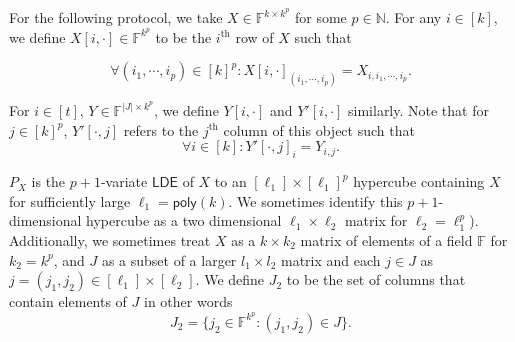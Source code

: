 \documentclass[11pt]{article}
\newcommand{\poly}{\mathsf{poly}}
\newcommand{\LDE}{\mathsf{LDE}}
\newcommand{\F}{\mathbb{F}}
\newcommand{\N}{\mathbb{N}}
\begin{document}
For the following protocol, we take $X\in \F^{k\times k^{p}}$ for some $p\in \N$. For any $i\in [k]$, we define $X[i,\cdot]\in \F^{k^{p}}$ to be the $i^{\text{th}}$ row of $X$ such that 

\begin{equation*}
    \forall (i_{1},\cdots, i_{p})\in [k]^{p}:X[i,\cdot]_{(i_{1},\cdots, i_{p})}=X_{i,i_{1},\cdots, i_{p}}. 
\end{equation*}

For $i\in [t]$, $Y\in \F^{|J|\times k^{p}}$, we define $Y[i,\cdot]$ and $Y'[i,\cdot]$ similarly. Note that for $j\in [k]^{p}$, $Y'[\cdot,j]$ refers to the $j^{\text{th}}$ column of this object such that 
\begin{equation*}
    \forall i\in [k]:Y'[\cdot,j]_{i}=Y_{i,j}. 
\end{equation*}

$P_{X}$ is the $p+1$-variate $\LDE$ of $X$ to an $[\ell_{1}]\times [\ell_{1}]^{p}$ hypercube containing $X$ for sufficiently large $\ell_{1}=\poly(k)$. We sometimes identify this $p+1$-dimensional hypercube as a two dimensional $\ell_{1}\times \ell_{2}$ matrix for $\ell_{2}=\ell_{1}^{p}$). Additionally, we sometimes treat $X$ as a $k \times k_{2}$ matrix of elements of a field $\mathbb{F}$ for $k_{2}=k^{p}$, and $J$ as a subset of a larger $l_{1}\times l_{2}$ matrix and each $j \in J$ as $j = (j_{1}, j_{2}) \in [\ell_{1}] \times [\ell_{2}]$. We define $J_{2}$ to be the set of columns that contain elements of $J$ in other words
\begin{equation*}
    J_{2}= \{j_{2}\in \F^{k^{p}} : (j_{1}, j_{2}) \in J\}.
\end{equation*} 
\end{document}
